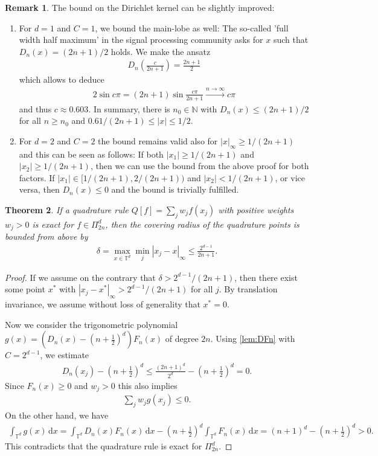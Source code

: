 \documentclass[11pt,a4paper,twoside,final,biblatex]{scrartcl}
\newcommand{\N}{\ensuremath{\mathbb{N}}}
\newcommand{\T}{\ensuremath{\mathbb{T}}}
\renewcommand{\d}{\,\mathrm{d}}
\newtheorem{theorem}{Theorem}[section]
\theoremstyle{definition}
\newtheorem{remark}[theorem]{Remark}
\numberwithin{equation}{section}
\numberwithin{table}{section}
\numberwithin{figure}{section}
\begin{document}
\begin{remark}\label{rem:DFn}
 The bound on the Dirichlet kernel can be slightly improved:
 \begin{enumerate}
     \item For $d=1$ and $C=1$, we bound the main-lobe as well: The so-called 'full width half maximum' in the signal processing community asks for $x$ such that $D_n(x)= (2n+1)/2$ holds. We make the ansatz
     \begin{align*}
       D_n\left(\frac{c}{2n+1}\right)=\frac{2n+1}2
     \end{align*}
     which allows to deduce
     \begin{align*}
         2 \sin c\pi = (2n+1)\sin \frac{c\pi}{2n+1} \overset{n\to\infty}\longrightarrow c\pi
     \end{align*}
     and thus $c\approx 0.603$. In summary, there is $n_0\in\N$ with $D_n(x)\le (2n+1)/2$ for all $n\ge n_0$ and $0.61/(2n+1)\le |x|\le 1/2$.
     \item For $d=2$ and $C=2$ the bound remains valid also for $|x|_\infty\ge 1/(2n+1)$ and this can be seen as follows: If both $|x_1|\ge 1/(2n+1)$ and $|x_2|\ge 1/(2n+1)$, then we can use the bound from the above proof for both factors. If $|x_1|\in [1/(2n+1),2/(2n+1))$ and $|x_2|< 1/(2n+1)$, or vice versa, then $D_n(x)\le 0$ and the bound is trivially fulfilled.
 \end{enumerate}
\end{remark}


\begin{theorem}\label{thm:deltaT}
 If a quadrature rule $Q[f]=\sum_j w_j f(x_j)$ with positive weights $w_j>0$ is exact for $f\in\Pi_{2n}^d$, then the covering radius of the quadrature points is bounded from above by
 \begin{align*}
     \delta=\max_{x\in\T^d} \min_{j} |x_j-x|_\infty \le \frac{2^{d-1}}{2n+1}.
 \end{align*}
\end{theorem}
\begin{proof}
 If we assume on the contrary that $\delta>2^{d-1}/(2n+1)$, then there exist some point $x^*$ with $|x_j-x^*|_\infty>2^{d-1}/(2n+1)$ for all $j$.
 By translation invariance, we assume without loss of generality that $x^*=0$. 
 
 Now we consider the trigonometric polynomial $g(x)=(D_n(x)- (n+\frac{1}{2})^d)F_n(x)$ of degree $2n$.
 Using \cref{lem:DFn} with $C=2^{d-1}$, we estimate
 \begin{align*}
  D_n(x_j)-\left(n+\frac{1}{2}\right)^d \le  \frac{(2n+1)^d}{2^d}- \left(n+\frac{1}{2}\right)^d = 0.
 \end{align*}
 Since $F_n(x)\ge 0$ and $w_j>0$ this also implies
 \begin{align*}
  \sum_j w_j g(x_j) \le 0.
 \end{align*}
 On the other hand, we have
 \begin{align*}
     \int_{\T^d} g(x)\d x
     = \int_{\T^d} D_n(x)F_n(x)\d x - \left(n+\frac{1}{2}\right)^d \int_{\T^d} F_n(x)\d x
     = (n+1)^d - \left(n+\frac{1}{2}\right)^d >0.
 \end{align*}
 This contradicts that the quadrature rule is exact for $\Pi_{2n}^d$.
\end{proof}
\end{document}
